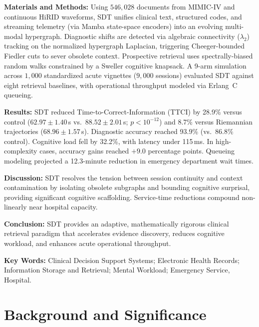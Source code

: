 \documentclass[12pt]{article}
\begin{document}
\noindent
\textbf{Materials and Methods:} Using $546{,}028$ documents from MIMIC-IV and continuous HiRID waveforms, SDT unifies clinical text, structured codes, and streaming telemetry (via Mamba state-space encoders) into an evolving multi-modal hypergraph. Diagnostic shifts are detected via algebraic connectivity ($\lambda_2$) tracking on the normalized hypergraph Laplacian, triggering Cheeger-bounded Fiedler cuts to sever obsolete context. Prospective retrieval uses spectrally-biased random walks constrained by a Sweller cognitive knapsack. A 9-arm simulation across $1{,}000$ standardized acute vignettes ($9{,}000$ sessions) evaluated SDT against eight retrieval baselines, with operational throughput modeled via Erlang~C queueing.

\noindent
\textbf{Results:} SDT reduced Time-to-Correct-Information (TTCI) by 28.9\% versus control ($62.97 \pm 1.40$\,s vs.\ $88.52 \pm 2.01$\,s; $p < 10^{-12}$) and 8.7\% versus Riemannian trajectories ($68.96 \pm 1.57$\,s). Diagnostic accuracy reached 93.9\% (vs.\ 86.8\% control). Cognitive load fell by 32.2\%, with latency under 115\,ms. In high-complexity cases, accuracy gains reached $+9.0$ percentage points. Queueing modeling projected a 12.3-minute reduction in emergency department wait times.

\noindent
\textbf{Discussion:} SDT resolves the tension between session continuity and context contamination by isolating obsolete subgraphs and bounding cognitive surprisal, providing significant cognitive scaffolding. Service-time reductions compound non-linearly near hospital capacity.

\noindent
\textbf{Conclusion:} SDT provides an adaptive, mathematically rigorous clinical retrieval paradigm that accelerates evidence discovery, reduces cognitive workload, and enhances acute operational throughput.

\vspace{0.5cm}
\noindent\textbf{Key Words:} Clinical Decision Support Systems; Electronic Health Records; Information Storage and Retrieval; Mental Workload; Emergency Service, Hospital.

\newpage

\section*{Background and Significance}
\end{document}
